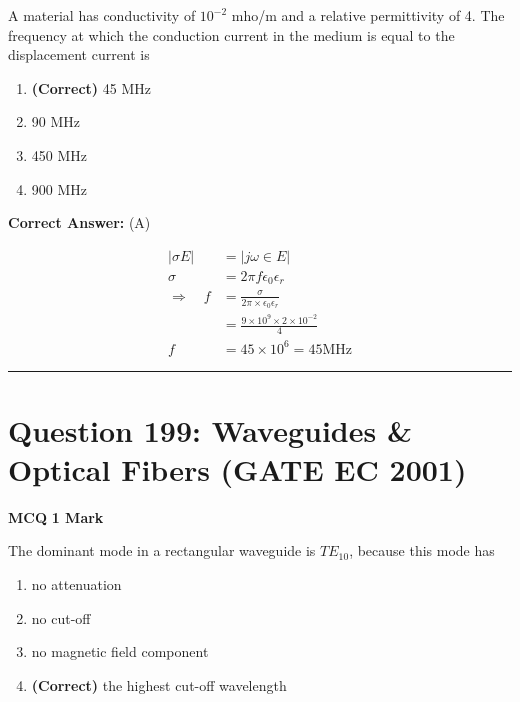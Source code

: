 \documentclass[11pt,a4paper]{article}
\begin{document}
\noindent A material has conductivity of $10^{-2}$
mho/m and a relative permittivity of 4. The
frequency at which the conduction current in the medium is equal to the
displacement current is


\begin{enumerate}[label=(\Alph*)]
    \item \textbf{(Correct)} 45 MHz
    \item 90 MHz
    \item 450 MHz
    \item 900 MHz
\end{enumerate}

\noindent \textbf{Correct Answer:} (A)

\begin{tcolorbox}[solbox, title=Detailed Solution -- Question 198]
\[
\begin{aligned} |\sigma E| &=|j \omega \in E| \\ \sigma &=2 \pi f \epsilon_{0} \epsilon_{r} \\ \Rightarrow \quad f &=\frac{\sigma}{2 \pi \times \epsilon_{0} \epsilon_{r}} \\ &=\frac{9 \times 10^{9} \times 2 \times 10^{-2}}{4} \\ f &=45 \times 10^{6}=45 \mathrm{MHz} \end{aligned}
\]
\end{tcolorbox}

\vspace{1.5em}
\hrule
\vspace{1.5em}

\section*{Question 199: Waveguides \& Optical Fibers (GATE EC 2001)}
\noindent \textbf{\color{primary}MCQ} \hfill \textbf{\color{secondary}1 Mark}


\noindent The dominant mode in a rectangular waveguide is $TE_{10}$, because this mode has


\begin{enumerate}[label=(\Alph*)]
    \item no attenuation
    \item no cut-off
    \item no magnetic field component
    \item \textbf{(Correct)} the highest cut-off wavelength
\end{enumerate}
\end{document}
